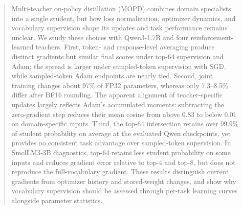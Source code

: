 \begin{abstract}
Multi-teacher on-policy distillation (MOPD) combines domain specialists into a single student, but how loss normalization, optimizer dynamics, and vocabulary supervision shape its updates and task performance remains unclear. We study these choices with Qwen3-1.7B and four reinforcement-learned teachers. First, token- and response-level averaging produce distinct gradients but similar final scores under top-64 supervision and Adam; the spread is larger under sampled-token supervision with SGD, while sampled-token Adam endpoints are nearly tied. Second, joint training changes about 97\% of FP32 parameters, whereas only 7.3--8.5\% differ after BF16 rounding. The apparent alignment of teacher-specific updates largely reflects Adam's accumulated moments: subtracting the zero-gradient step reduces their mean cosine from above 0.83 to below 0.01 on domain-specific inputs. Third, the top-64 intersection retains over 99.9\% of student probability on average at the evaluated Qwen checkpoints, yet provides no consistent task advantage over sampled-token supervision. In SmolLM3-3B diagnostics, top-64 retains less student probability on some inputs and reduces gradient error relative to top-4 and top-8, but does not reproduce the full-vocabulary gradient. These results distinguish current gradients from optimizer history and stored-weight changes, and show why vocabulary supervision should be assessed through per-task learning curves alongside parameter statistics.
\end{abstract}
